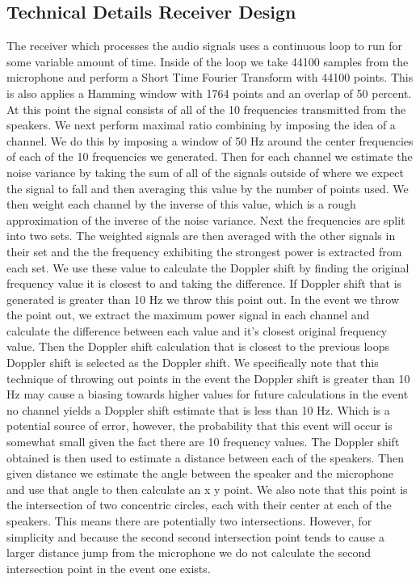 \documentclass{acm_proc_article-sp}
\begin{document}
\subsection{Technical Details Receiver Design} \label{technical_details Receiver Design}
The receiver which processes the audio signals uses a continuous loop to run for some variable amount of time. Inside of the loop we take 44100 samples from the microphone and perform a Short Time Fourier Transform with 44100 points. This is also applies a Hamming window with 1764 points and an overlap of 50 percent. At this point the signal consists of all of the 10 frequencies transmitted from the speakers. We next perform maximal ratio combining by imposing the idea of a channel. We do this by imposing a window of 50 Hz around the center frequencies of each of the 10 frequencies we generated. Then for each channel we estimate the noise variance by taking the sum of all of the signals outside of where we expect the signal to fall and then averaging this value by the number of points used. We then weight each channel by the inverse of this value, which is a rough approximation of the inverse of the noise variance. Next the frequencies are split into two sets.  The weighted signals are then averaged with the other signals in their set and the the frequency exhibiting the strongest power is extracted from each set. We use these value to calculate the Doppler shift by finding the original frequency value it is closest to and taking the difference. If Doppler shift that is generated is greater than 10 Hz we throw this point out. In the event we throw the point out, we extract the maximum power signal in each channel and calculate the difference between each value and it's closest original frequency value. Then the Doppler shift calculation that is closest to the previous loops Doppler shift is selected as the Doppler shift. We specifically note that this technique of throwing out points in the event the Doppler shift is greater than 10 Hz may cause a biasing towards higher values for future calculations in the event no channel yields a Doppler shift estimate that is less than 10 Hz. Which is a potential source of error, however, the probability that this event will occur is somewhat small given the fact there are 10 frequency values.  The Doppler shift obtained is then used to estimate a distance between each of the speakers. Then given distance we estimate the angle between the speaker and the microphone and use that angle to then calculate an x y point. We also note that this point is the intersection of two concentric circles, each with their center at each of the speakers. This means there are potentially two intersections. However, for simplicity and because the second second intersection point tends to cause a larger distance jump from the microphone we do not calculate the second intersection point in the event one exists. 
\end{document}
